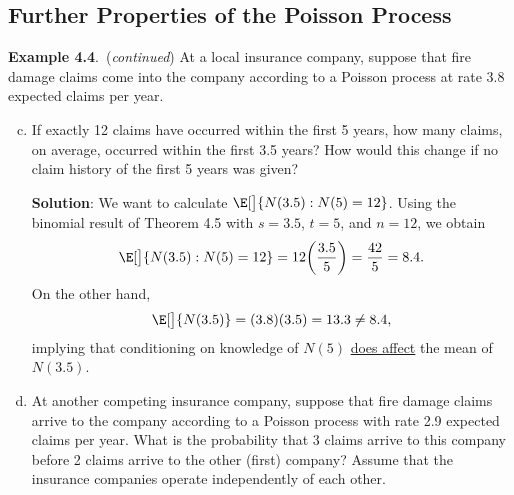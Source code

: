 \subsection*{Further Properties of the Poisson Process}
\begin{Example}
    \textbf{Example 4.4}.\ (\emph{continued}) At a local insurance company, suppose that fire damage claims
    come into the company according to a Poisson process at rate 3.8 expected claims per year.
    \begin{enumerate}[(a)]
        \setcounter{enumi}{2}
        \item If exactly 12 claims have occurred within the first 5 years, how many claims, on average,
              occurred within the first 3.5 years? How would this change if no claim history of the first 5
              years was given?

              \textbf{Solution}: We want to calculate $ \E[\big]{N(3.5)\given N(5)=12} $.
              Using the binomial result of Theorem 4.5 with $ s=3.5 $, $ t=5 $,
              and $ n=12 $, we obtain
              \[ \E[\big]{N(3.5)\given N(5)=12}=12\biggl(\frac{3.5}{5}\biggr)=\frac{42}{5}= 8.4. \]
              On the other hand,
              \[ \E[\big]{N(3.5)}=(3.8)(3.5)=13.3\ne 8.4, \]
              implying that conditioning on knowledge of $ N(5) $
              \underline{does affect} the mean of $ N(3.5) $.

        \item At another competing insurance company, suppose that fire damage claims arrive to the
              company according to a Poisson process with rate 2.9 expected claims per year. What is the
              probability that 3 claims arrive to this company before 2 claims arrive to the other (first)
              company? Assume that the insurance companies operate independently of each other.


\end{enumerate}
\end{Example}
